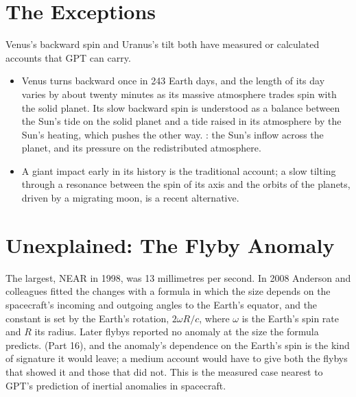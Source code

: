 \documentclass[11pt,a4paper]{article}
\begin{document}
\section{The Exceptions}
\label{sec:exceptions}

Venus's backward spin and Uranus's tilt both have measured or calculated accounts that GPT can carry.
\begin{itemize}
\item {} Venus turns backward once in 243 Earth days, and the length of its day varies by about twenty minutes as its massive atmosphere trades spin with the solid planet. Its slow backward spin is understood as a balance between the Sun's tide on the solid planet and a tide raised in its atmosphere by the Sun's heating, which pushes the other way. : the Sun's inflow across the planet, and its pressure on the redistributed atmosphere.
\item {} A giant impact early in its history is the traditional account; a slow tilting through a resonance between the spin of its axis and the orbits of the planets, driven by a migrating moon, is a recent alternative.
\end{itemize}

\section{Unexplained: The Flyby Anomaly}
\label{sec:flyby}

 The largest, NEAR in 1998, was 13 millimetres per second. In 2008 Anderson and colleagues fitted the changes with a formula in which the size depends on the spacecraft's incoming and outgoing angles to the Earth's equator, and the constant is set by the Earth's rotation, $2\omega R/c$, where $\omega$ is the Earth's spin rate and $R$ its radius. Later flybys reported no anomaly at the size the formula predicts.   (Part 16), and the anomaly's dependence on the Earth's spin is the kind of signature it would leave; a medium account would have to give both the flybys that showed it and those that did not. This is the measured case nearest to GPT's prediction of inertial anomalies in spacecraft.
\end{document}
